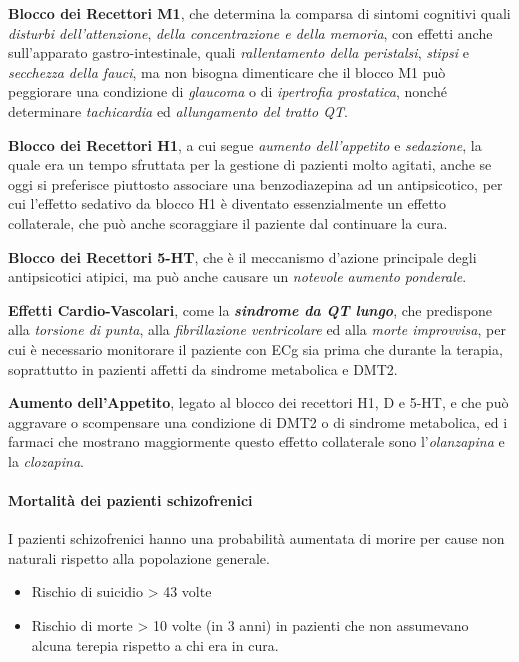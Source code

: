 \textbf{Blocco dei Recettori M1}, che determina la comparsa di sintomi
cognitivi quali \emph{disturbi dell'attenzione}, \emph{della
concentrazione e della memoria}, con effetti anche sull'apparato
gastro-intestinale, quali \emph{rallentamento della peristalsi},
\emph{stipsi} e \emph{secchezza della fauci}, ma non bisogna dimenticare
che il blocco M1 può peggiorare una condizione di \emph{glaucoma} o di
\emph{ipertrofia prostatica}, nonché determinare \emph{tachicardia} ed
\emph{allungamento del tratto QT}.

\textbf{Blocco dei Recettori H1}, a cui segue \emph{aumento
dell'appetito} e \emph{sedazione}, la quale era un tempo sfruttata per
la gestione di pazienti molto agitati, anche se oggi si preferisce
piuttosto associare una benzodiazepina ad un antipsicotico, per cui
l'effetto sedativo da blocco H1 è diventato essenzialmente un effetto
collaterale, che può anche scoraggiare il paziente dal continuare la
cura.

\textbf{Blocco dei Recettori 5-HT}, che è il meccanismo d'azione
principale degli antipsicotici atipici, ma può anche causare un
\emph{notevole aumento ponderale}.

\textbf{Effetti Cardio-Vascolari}, come la \textbf{\emph{sindrome da QT
lungo}}, che predispone alla \emph{torsione di punta}, alla
\emph{fibrillazione ventricolare} ed alla \emph{morte improvvisa}, per
cui è necessario monitorare il paziente con ECg sia prima che durante la
terapia, soprattutto in pazienti affetti da sindrome metabolica e DMT2.

\textbf{Aumento dell'Appetito}, legato al blocco dei recettori H1, D e
5-HT, e che può aggravare o scompensare una condizione di DMT2 o di
sindrome metabolica, ed i farmaci che mostrano maggiormente questo
effetto collaterale sono l'\emph{olanzapina} e la \emph{clozapina}.

\paragraph{Mortalità dei pazienti schizofrenici}

I pazienti schizofrenici hanno una probabilità aumentata di morire per
cause non naturali rispetto alla popolazione generale.

\begin{itemize}
\item
  Rischio di suicidio \textgreater{} 43 volte
\item
  Rischio di morte \textgreater{} 10 volte (in 3 anni) in pazienti che
  non assumevano alcuna terepia rispetto a chi era in cura.
\end{itemize}


